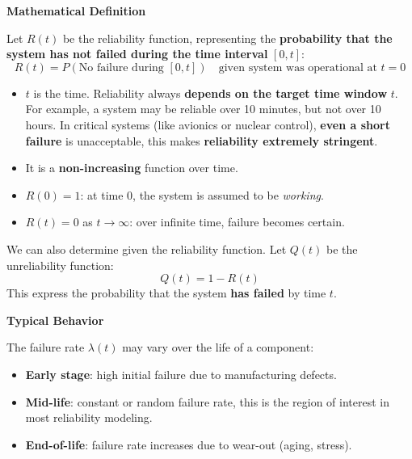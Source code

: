 \highspace
\begin{flushleft}
    \textcolor{Green3}{ \textbf{Mathematical Definition}}
\end{flushleft}
Let $R(t)$ be the reliability function, representing the \textbf{probability that the system has not failed during the time interval} $\left[0, t\right]$:
\begin{equation}\label{eq: probability that the system has not failed during the time interval}
    R(t) = P\left(\text{No failure during } \left[0, t\right]\right) \quad \text{given system was operational at } t = 0    
\end{equation}
\begin{itemize}
    \item $t$ is the time. Reliability always \textbf{depends on the target time window} $t$. For example, a system may be reliable over 10 minutes, but not over 10 hours. In critical systems (like avionics or nuclear control), \textbf{even a short failure} is unacceptable, this makes \textbf{reliability extremely stringent}.
    \item It is a \textbf{non-increasing} function over time.
    \item $R(0) = 1$: at time 0, the system is assumed to be \emph{working}.
    \item $R(t) = 0$ as $t \rightarrow \infty$: over infinite time, failure becomes certain.
\end{itemize}
We can also determine  given the reliability function. Let $Q\left(t\right)$ be the unreliability function:
\begin{equation}\label{eq: unreliability}
    Q\left(t\right) = 1 - R\left(t\right)
\end{equation}
This express the probability that the system \textbf{has failed} by time $t$.

\highspace
\begin{flushleft}
    \textcolor{Green3}{ \textbf{Typical Behavior}}
\end{flushleft}
The failure rate $\lambda\left(t\right)$ may vary over the life of a component:
\begin{itemize}
    \item \textbf{Early stage}: high initial failure due to manufacturing defects.
    \item \textbf{Mid-life}: constant or random failure rate, this is the region of interest in most reliability modeling.
    \item \textbf{End-of-life}: failure rate increases due to wear-out (aging, stress).
\end{itemize}

